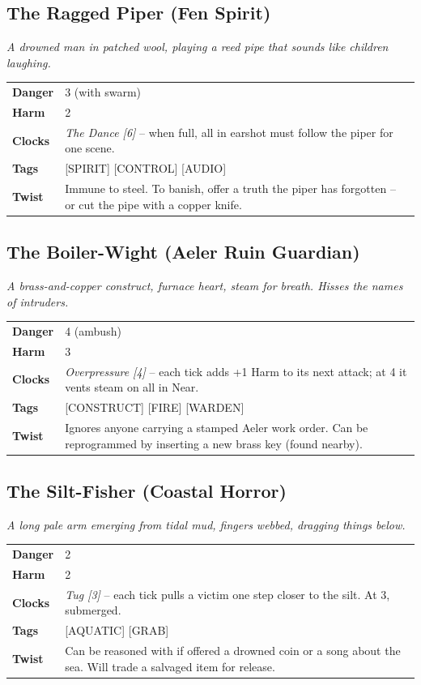 \documentclass[10pt,twocolumn]{article}
\newcommand{\kw}[1]{\textbf{#1}}     %
\begin{document}
\subsection*{The Ragged Piper (Fen Spirit)}
\emph{A drowned man in patched wool, playing a reed pipe that sounds like children laughing.}
\begin{tabular}{@{}ll}
\toprule
\kw{Danger} & 3 (with swarm) \\
\kw{Harm}   & 2 \\
\kw{Clocks} & \textit{The Dance [6]} -- when full, all in earshot must follow the piper for one scene. \\
\kw{Tags}   & [SPIRIT] [CONTROL] [AUDIO] \\
\kw{Twist}  & Immune to steel. To banish, offer a truth the piper has forgotten -- or cut the pipe with a copper knife. \\
\bottomrule
\end{tabular}

\subsection*{The Boiler-Wight (Aeler Ruin Guardian)}
\emph{A brass-and-copper construct, furnace heart, steam for breath. Hisses the names of intruders.}
\begin{tabular}{@{}ll}
\toprule
\kw{Danger} & 4 (ambush) \\
\kw{Harm}   & 3 \\
\kw{Clocks} & \textit{Overpressure [4]} -- each tick adds +1 Harm to its next attack; at 4 it vents steam on all in Near. \\
\kw{Tags}   & [CONSTRUCT] [FIRE] [WARDEN] \\
\kw{Twist}  & Ignores anyone carrying a stamped Aeler work order. Can be reprogrammed by inserting a new brass key (found nearby). \\
\bottomrule
\end{tabular}

\subsection*{The Silt-Fisher (Coastal Horror)}
\emph{A long pale arm emerging from tidal mud, fingers webbed, dragging things below.}
\begin{tabular}{@{}ll}
\toprule
\kw{Danger} & 2 \\
\kw{Harm}   & 2 \\
\kw{Clocks} & \textit{Tug [3]} -- each tick pulls a victim one step closer to the silt. At 3, submerged. \\
\kw{Tags}   & [AQUATIC] [GRAB] \\
\kw{Twist}  & Can be reasoned with if offered a drowned coin or a song about the sea. Will trade a salvaged item for release. \\
\bottomrule
\end{tabular}
\end{document}
